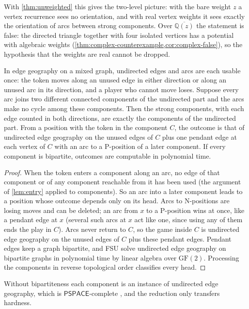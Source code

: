 \documentclass[final]{siamart0516}
\numberwithin{theorem}{section}
\numberwithin{equation}{section}
\theoremstyle{siamnonum}
\theoremstyle{plain}
\newcommand{\QQ}{\mathbb{Q}}
\newcommand{\Qzbar}{\overline{\QQ(z)}}
\newcommand{\cls}[1]{\mathsf{#1}}
\newcommand{\PSPACE}{\cls{PSPACE}}
\begin{document}
With \cref{thm:unweighted} this gives the two-level picture: with the bare weight $z$ a vertex recurrence sees no orientation, and with real vertex weights it sees exactly the orientation of arcs between strong components. Over $\Qzbar$ the statement is false: the directed triangle together with four isolated vertices has a potential with algebraic weights (\cref{thm:complex-counterexample,cor:complex-false}), so the hypothesis that the weights are real cannot be dropped.

\begin{corollary}\label{cor:edge-geo}
In edge geography on a mixed graph, undirected edges and arcs are each usable once: the token moves along an unused edge in either direction or along an unused arc in its direction, and a player who cannot move loses. Suppose every arc joins two different connected components of the undirected part and the arcs make no cycle among these components. Then the strong components, with each edge counted in both directions, are exactly the components of the undirected part. From a position with the token in the component $C$, the outcome is that of undirected edge geography on the unused edges of $C$ plus one pendant edge at each vertex of $C$ with an arc to a P-position of a later component. If every component is bipartite, outcomes are computable in polynomial time.
\end{corollary}
\begin{proof}
When the token enters a component along an arc, no edge of that component or of any component reachable from it has been used (the argument of \cref{lem:entry} applied to components). So an arc into a later component leads to a position whose outcome depends only on its head. Arcs to N-positions are losing moves and can be deleted; an arc from $x$ to a P-position wins at once, like a pendant edge at $x$ (several such arcs at $x$ act like one, since using any of them ends the play in $C$). Arcs never return to $C$, so the game inside $C$ is undirected edge geography on the unused edges of $C$ plus these pendant edges. Pendant edges keep a graph bipartite, and FSU \cite{FSU} solve undirected edge geography on bipartite graphs in polynomial time by linear algebra over $\mathrm{GF}(2)$. Processing the components in reverse topological order classifies every head.
\end{proof}

Without bipartiteness each component is an instance of undirected edge geography, which is $\PSPACE$-complete \cite{FSU}, and the reduction only transfers hardness.
\end{document}
